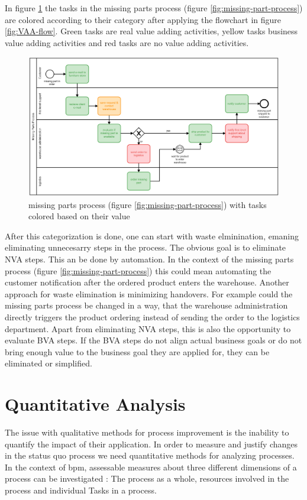 In figure \ref{fig:VAA-missing-parts} the tasks in the missing parts process (figure \ref{fig:missing-part-process}) are colored according to their category after applying the flowchart in figure \ref{fig:VAA-flow}. Green tasks are real value adding activities, yellow tasks business value adding activities and red tasks are no value adding activities. 

\begin{figure}[H]
	\centering
	\includegraphics[width=1\columnwidth]{graphics/missing-parts-process-vaa}
	\caption{missing parts process (figure \ref{fig:missing-part-process}) with tasks colored based on their value} 
	\label{fig:VAA-missing-parts} 
\end{figure}

After this categorization is done, one can start with waste elminination, emaning eliminating unnecesarry steps in the process. The obvious goal is to eliminate NVA steps. This an be done by automation. In the context of the missing parts process (figure \ref{fig:missing-part-process}) this could mean automating the customer notification after the ordered product enters the warehouse. Another approach for waste elimination is minimizing handovers. For example could the missing parts process be changed in a way, that the warehouse administration directly triggers the product ordering instead of sending the order to the logistics department. Apart from eliminating NVA steps, this is also the opportunity to evaluate BVA steps. If the BVA steps do not align actual business goals or do not bring enough value to the business goal they are applied for, they can be eliminated or simplified. \cite{fundamentals}\cite{harrington2016value}

\section{Quantitative Analysis}
The issue with qualitative methods for process improvement is the inability to quantify the impact of their application. In order to measure and justify changes in the status quo process we need quantitative methods for analyzing processes. In the context of \gls{bpm}, assessable measures about three different dimensions of a process can be investigated : The process as a whole, resources involved in the process and individual Tasks in a process. \cite{fundamentals}


